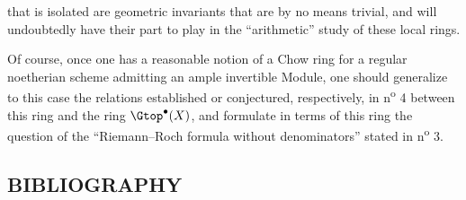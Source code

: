 %
that is isolated are geometric invariants that are by no means trivial, and will undoubtedly have their part to play in the ``arithmetic'' study of these local rings.

Of course, once one has a reasonable notion of a Chow ring for a regular noetherian scheme admitting an ample invertible Module, one should generalize to this case the relations established or conjectured, respectively, in n\textsuperscript{o} 4 between this ring and the ring $\Gtop^\bullet(X)$, and formulate in terms of this ring the question of the ``Riemann--Roch formula without denominators'' stated in n\textsuperscript{o} 3.

\subsection*{BIBLIOGRAPHY}
